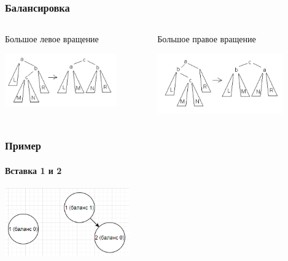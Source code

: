 \documentclass{../../slides-style}
\begin{document}
    \begin{frame}
        \frametitle{Балансировка}
        \begin{columns}
            \begin{column}{0.5\textwidth}
                Большое левое вращение
                \begin{center}
                    \includegraphics[width=0.8\textwidth]{big-left-rotation.png}
                \end{center}
            \end{column}
            \begin{column}{0.5\textwidth}
                Большое правое вращение
                \begin{center}
                    \includegraphics[width=0.8\textwidth]{big-right-rotation.png}
                \end{center}
            \end{column}
        \end{columns}
    \end{frame}

    \begin{frame}
        \frametitle{Пример}
        \framesubtitle{Вставка 1 и 2}
        \begin{center}
            \includegraphics[width=0.4\textwidth]{avl12.png}
        \end{center}
    \end{frame}
\end{document}
